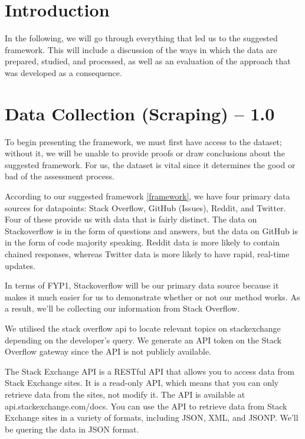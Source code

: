\section{Introduction}
In the following, we will go through everything that led us to the suggested framework. This will include a discussion of the ways in which the data are prepared, studied, and processed, as well as an evaluation of the approach that was developed as a consequence.

\section{Data Collection (Scraping) -- 1.0}
To begin presenting the framework, we must first have access to the dataset; without it, we will be unable to provide proofs or draw conclusions about the suggested framework. For us, the dataset is vital since it determines the good or bad of the assessment process. 

According to our suggested framework \ref*{framework}, we have four primary data sources for datapoints: Stack Overflow, GitHub (Issues), Reddit, and Twitter. Four of these provide us with data that is fairly distinct. The data on Stackoverflow is in the form of questions and answers, but the data on GitHub is in the form of code majority speaking. Reddit data is more likely to contain chained responses, whereas Twitter data is more likely to have rapid, real-time updates.

In terms of FYP1, Stackoverflow will be our primary data source because it makes it much easier for us to demonstrate whether or not our method works. As a result, we'll be collecting our information from Stack Overflow.

We utilised the stack overflow api to locate relevant topics on stackexchange depending on the developer's query. We generate an API token on the Stack Overflow gateway since the API is not publicly available.

The Stack Exchange API is a RESTful API that allows you to access data from Stack Exchange sites. It is a read-only API, which means that you can only retrieve data from the sites, not modify it. The API is available at api.stackexchange.com/docs. You can use the API to retrieve data from Stack Exchange sites in a variety of formats, including JSON, XML, and JSONP. We'll be quering the data in JSON format. 

